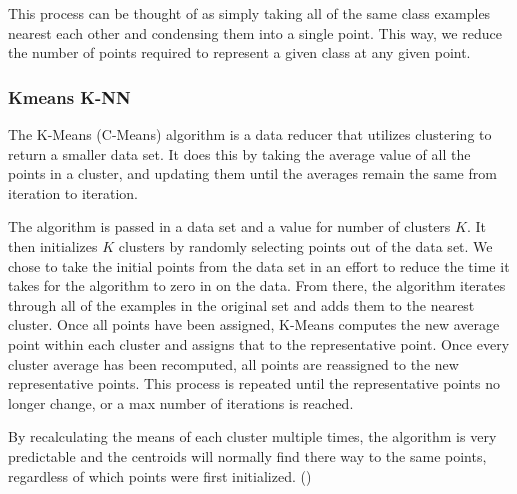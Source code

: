 \documentclass[twoside,11pt]{article}
\begin{document}
This process can be thought of as simply taking all of the same class examples nearest each other and condensing them into a single point. This way, we reduce the number of points required to represent a given class at any given point.

\subsubsection{Kmeans K-NN}

The K-Means (C-Means) algorithm is a data reducer that utilizes clustering to return a smaller data set. It does this by taking the average value of all the points in a cluster, and updating them until the averages remain the same from iteration to iteration.

 The algorithm is passed in a data set and a value for number of clusters $K$. It then initializes $K$ clusters by randomly selecting points out of the data set. We chose to take the initial points from the data set in an effort to reduce the time it takes for the algorithm to zero in on the data. From there, the algorithm iterates through all of the examples in the original set and adds them to the nearest cluster. Once all points have been assigned, K-Means computes the new average point within each cluster and assigns that to the representative point. Once every cluster average has been recomputed, all points are reassigned to the new representative points. This process is repeated until the representative points no longer change, or a max number of iterations is reached.

By recalculating the means of each cluster multiple times, the algorithm is very predictable and the centroids will normally find there way to the same points, regardless of which points were first initialized. (\cite{CMeans})
\end{document}
